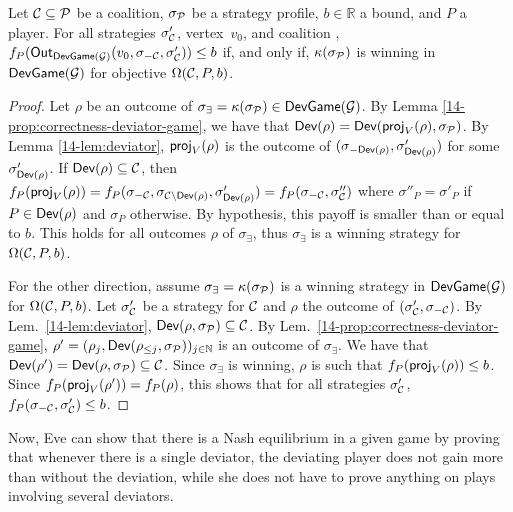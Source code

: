 \begin{lemma} \label{14-lem:omegaCAg}
  Let \(\mathcal{C} \subseteq \mathcal{P}\) be a coalition,
  \(\sigma_{\mathcal{P}}\) be a strategy profile, \(b \in \mathbb{R}\) a bound,
  and \(P\) a player. For all strategies \(\sigma'_{\mathcal{C}}\), vertex~$v_0$,
  and coalition \Coalition, \(f_P(\textsf{Out}_{\textsf{DevGame}(\mathcal{G})}(v_0, \sigma_{-\mathcal{C}}, \sigma'_{\mathcal{C}})) \le b\) if, and
  only if, \(\kappa(\sigma_{\mathcal{P}})\) is winning in \(\textsf{DevGame}(\mathcal{G})\) for objective
  \(\Omega(\mathcal{C}, P, b)\).
\end{lemma}
\begin{proof} Let \(\rho\) be an outcome of
  \(\sigma_\exists=\kappa(\sigma_{\mathcal{P}}) \in \textsf{DevGame}(\mathcal{G})\). By Lemma
  \ref{14-prop:correctness-deviator-game}, we have that
  \(\textsf{Dev}(\rho) = \textsf{Dev}(\textsf{proj}_V(\rho),\sigma_{\mathcal{P}})\). By Lemma
  \ref{14-lem:deviator}, \(\textsf{proj}_V(\rho)\) is the outcome of
  \((\sigma_{-\textsf{Dev}(\rho)},\sigma'_{\textsf{Dev}(\rho)})\) for some
  \(\sigma'_{\textsf{Dev}(\rho)}\). If \(\textsf{Dev}(\rho) \subseteq \mathcal{C}\), then
  \(f_P(\textsf{proj}_V(\rho)) = f_P(\sigma_{-\mathcal{C}},\sigma_{\mathcal{C}\setminus \textsf{Dev}(\rho)}, \sigma'_{\textsf{Dev}(\rho)}) = f_P(\sigma_{-\mathcal{C}},\sigma''_{\mathcal{C}})\)
  where \(\sigma''_P = \sigma'_P\) if \(P \in \textsf{Dev}(\rho)\) and \(\sigma_P\)
  otherwise. By hypothesis, this payoff is smaller than or equal to \(b\).
  This holds for
  all outcomes \(\rho\) of \(\sigma_\exists\), thus \(\sigma_\exists\) is
  a winning strategy for \(\Omega(\mathcal{C},P,b)\).

  For the other direction, assume \(\sigma_\exists = \kappa(\sigma_{\mathcal{P}})\)
  is a winning strategy in \(\textsf{DevGame}(\mathcal{G})\) for \(\Omega(\mathcal{C},P,b)\). Let
  \(\sigma'_{\mathcal{C}}\) be a strategy for \(\mathcal{C}\) and \(\rho\) the outcome of
  \((\sigma'_{\mathcal{C}},\sigma_{-{\mathcal{C}}})\). By
  Lem.~\ref{14-lem:deviator},
  \(\textsf{Dev}(\rho,\sigma_{\mathcal{P}}) \subseteq \mathcal{C}\). By
  Lem.~\ref{14-prop:correctness-deviator-game},
  \(\rho'= (\rho_j, \textsf{Dev}(\rho_{\le j},\sigma_{\mathcal{P}}))_{j\in \mathbb{N}}\) is
  an outcome of \(\sigma_\exists\). We have that
  \(\textsf{Dev}(\rho') = \textsf{Dev}(\rho,\sigma_{\mathcal{P}}) \subseteq \mathcal{C}\). Since
  \(\sigma_\exists\) is winning, \(\rho\) is such that
  \(f_P(\textsf{proj}_V(\rho)) \le b\). Since
  \(f_{P}(\textsf{proj}_V(\rho')) = f_{P}(\rho)\),
  this shows that for all strategies \(\sigma'_{\mathcal{C}}\),
  \(f_P(\sigma_{-\mathcal{C}},\sigma'_{\mathcal{C}}) \le b\).
\end{proof}

Now, Eve can show that there is a Nash equilibrium in a given game
by proving that whenever there is a single deviator,
the deviating player does not gain more than without the deviation,
while she does not have to prove anything on plays involving several
deviators.

